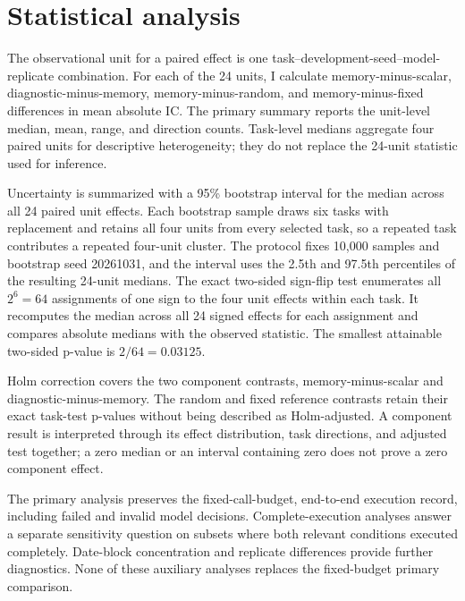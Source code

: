 \section{Statistical analysis}
\label{sec:analysis}

The observational unit for a paired effect is one task--development-seed--model-replicate combination. For each of the 24 units, I calculate memory-minus-scalar, diagnostic-minus-memory, memory-minus-random, and memory-minus-fixed differences in mean absolute IC. The primary summary reports the unit-level median, mean, range, and direction counts. Task-level medians aggregate four paired units for descriptive heterogeneity; they do not replace the 24-unit statistic used for inference.

Uncertainty is summarized with a 95\% bootstrap interval for the median across all 24 paired unit effects. Each bootstrap sample draws six tasks with replacement and retains all four units from every selected task, so a repeated task contributes a repeated four-unit cluster. The protocol fixes 10{,}000 samples and bootstrap seed 20261031, and the interval uses the 2.5th and 97.5th percentiles of the resulting 24-unit medians. The exact two-sided sign-flip test enumerates all $2^6=64$ assignments of one sign to the four unit effects within each task. It recomputes the median across all 24 signed effects for each assignment and compares absolute medians with the observed statistic. The smallest attainable two-sided p-value is $2/64=0.03125$.

Holm correction covers the two component contrasts, memory-minus-scalar and diagnostic-minus-memory. The random and fixed reference contrasts retain their exact task-test p-values without being described as Holm-adjusted. A component result is interpreted through its effect distribution, task directions, and adjusted test together; a zero median or an interval containing zero does not prove a zero component effect.

The primary analysis preserves the fixed-call-budget, end-to-end execution record, including failed and invalid model decisions. Complete-execution analyses answer a separate sensitivity question on subsets where both relevant conditions executed completely. Date-block concentration and replicate differences provide further diagnostics. None of these auxiliary analyses replaces the fixed-budget primary comparison.
